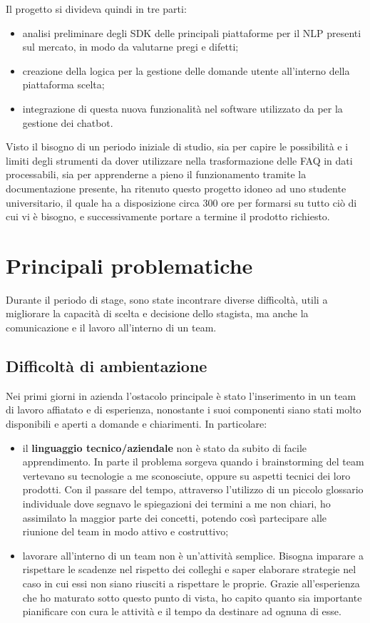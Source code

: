 Il progetto si divideva quindi in tre parti:
\begin{itemize}
	\item analisi preliminare degli SDK delle principali piattaforme per il \gls{NLP} presenti sul mercato, in modo da valutarne pregi e difetti;
	\item creazione della logica per la gestione delle domande utente all'interno della piattaforma scelta;
	\item integrazione di questa nuova funzionalità nel software utilizzato da \azienda{} per la gestione dei \gls{chatbot}. 
\end{itemize}
Visto il bisogno di un periodo iniziale di studio, sia per capire le possibilità e i limiti degli strumenti da dover utilizzare nella trasformazione delle \gls{FAQ} in dati processabili, sia per apprenderne a pieno il funzionamento tramite la documentazione presente, \azienda{} ha ritenuto questo progetto idoneo ad uno studente universitario, il quale ha a disposizione circa 300 ore per formarsi su tutto ciò di cui vi è bisogno, e successivamente portare a termine il prodotto richiesto.
\section{Principali problematiche}
Durante il periodo di stage, sono state incontrare diverse difficoltà, utili a migliorare la capacità di scelta e decisione dello stagista, ma anche la comunicazione e il lavoro all'interno di un team.

\subsection{Difficoltà di ambientazione}
Nei primi giorni in azienda l'ostacolo principale è stato l'inserimento in un team di lavoro affiatato e di esperienza, nonostante i suoi componenti siano stati molto disponibili e aperti a domande e chiarimenti. In particolare:
\begin{itemize}
	\item il \textbf{linguaggio tecnico/aziendale} non è stato da subito di facile apprendimento. In parte il problema sorgeva quando i brainstorming del team vertevano su tecnologie a me sconosciute, oppure su aspetti tecnici dei loro prodotti. Con il passare del tempo, attraverso l'utilizzo di un piccolo glossario individuale dove segnavo le spiegazioni dei termini a me non chiari, ho assimilato la maggior parte dei concetti, potendo così partecipare alle riunione del team in modo attivo e costruttivo;
	\item lavorare all'interno di un team non è un'attività semplice. Bisogna imparare a rispettare le scadenze nel rispetto dei colleghi e saper elaborare strategie nel caso in cui essi non siano riusciti a rispettare le proprie. Grazie all'esperienza che ho maturato sotto questo punto di vista, ho capito quanto sia importante pianificare con cura le attività e il tempo da destinare ad ognuna di esse.
\end{itemize}

